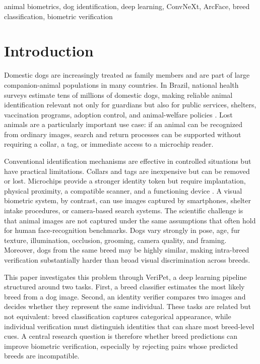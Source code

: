 \documentclass[conference]{IEEEtran}
\begin{document}
\begin{IEEEkeywords}
animal biometrics, dog identification, deep learning, ConvNeXt, ArcFace, breed classification, biometric verification
\end{IEEEkeywords}

\section{Introduction}

Domestic dogs are increasingly treated as family members and are part of large companion-animal populations in many countries. In Brazil, national health surveys estimate tens of millions of domestic dogs, making reliable animal identification relevant not only for guardians but also for public services, shelters, vaccination programs, adoption control, and animal-welfare policies \cite{ibge2020animais,sinir2020}. Lost animals are a particularly important use case: if an animal can be recognized from ordinary images, search and return processes can be supported without requiring a collar, a tag, or immediate access to a microchip reader.

Conventional identification mechanisms are effective in controlled situations but have practical limitations. Collars and tags are inexpensive but can be removed or lost. Microchips provide a stronger identity token but require implantation, physical proximity, a compatible scanner, and a functioning device \cite{leone2010microchip}. A visual biometric system, by contrast, can use images captured by smartphones, shelter intake procedures, or camera-based search systems. The scientific challenge is that animal images are not captured under the same assumptions that often hold for human face-recognition benchmarks. Dogs vary strongly in pose, age, fur texture, illumination, occlusion, grooming, camera quality, and framing. Moreover, dogs from the same breed may be highly similar, making intra-breed verification substantially harder than broad visual discrimination across breeds.

This paper investigates this problem through VeriPet, a deep learning pipeline structured around two tasks. First, a breed classifier estimates the most likely breed from a dog image. Second, an identity verifier compares two images and decides whether they represent the same individual. These tasks are related but not equivalent: breed classification captures categorical appearance, while individual verification must distinguish identities that can share most breed-level cues. A central research question is therefore whether breed predictions can improve biometric verification, especially by rejecting pairs whose predicted breeds are incompatible.
\end{document}
